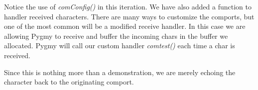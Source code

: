 \documentclass{article}
\begin{document}
Notice the use of \emph{comConfig()} in this iteration. We have also added a function to handler received characters. There are many ways to customize the comports, but one of the most common will be a modified receive handler. In this case we are allowing Pygmy to receive and buffer the incoming chars in the buffer we allocated. Pygmy will call our custom handler \emph{comtest()} each time a char is received.

Since this is nothing more than a demonstration, we are merely echoing the character back to the originating comport.
\end{document}
